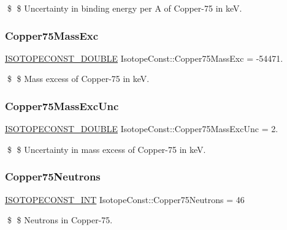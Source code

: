 \$ \$ Uncertainty in binding energy per A of Copper-\/75 in keV. \mbox{\label{group___isotope_const-_copper-_cu75_ga36022fb786042b412fc9b865a4fa6c2e}} 
\subsubsection{\texorpdfstring{Copper75\+Mass\+Exc}{Copper75MassExc}}
{\footnotesize\ttfamily \mbox{\hyperlink{group___isotope_const-_macros_ga8f45a7272ce02c0b4c65c44636ed719a}{I\+S\+O\+T\+O\+P\+E\+C\+O\+N\+S\+T\+\_\+\+D\+O\+U\+B\+LE}} Isotope\+Const\+::\+Copper75\+Mass\+Exc = -\/54471.}

\$ \$ Mass excess of Copper-\/75 in keV. \mbox{\label{group___isotope_const-_copper-_cu75_ga756ef7b32b33faa5d81aafbe9aa9df7c}} 
\subsubsection{\texorpdfstring{Copper75\+Mass\+Exc\+Unc}{Copper75MassExcUnc}}
{\footnotesize\ttfamily \mbox{\hyperlink{group___isotope_const-_macros_ga8f45a7272ce02c0b4c65c44636ed719a}{I\+S\+O\+T\+O\+P\+E\+C\+O\+N\+S\+T\+\_\+\+D\+O\+U\+B\+LE}} Isotope\+Const\+::\+Copper75\+Mass\+Exc\+Unc = 2.}

\$ \$ Uncertainty in mass excess of Copper-\/75 in keV. \mbox{\label{group___isotope_const-_copper-_cu75_ga5d2cdd30c1691313f8e5e6894b5fce82}} 
\subsubsection{\texorpdfstring{Copper75\+Neutrons}{Copper75Neutrons}}
{\footnotesize\ttfamily \mbox{\hyperlink{group___isotope_const-_macros_ga5f18360b3e99483a35c32d789e62621c}{I\+S\+O\+T\+O\+P\+E\+C\+O\+N\+S\+T\+\_\+\+I\+NT}} Isotope\+Const\+::\+Copper75\+Neutrons = 46}

\$ \$ Neutrons in Copper-\/75. \mbox{\label{group___isotope_const-_copper-_cu75_ga4a5a3e6ae81d81acea8a3df5a5ba2880}} 
